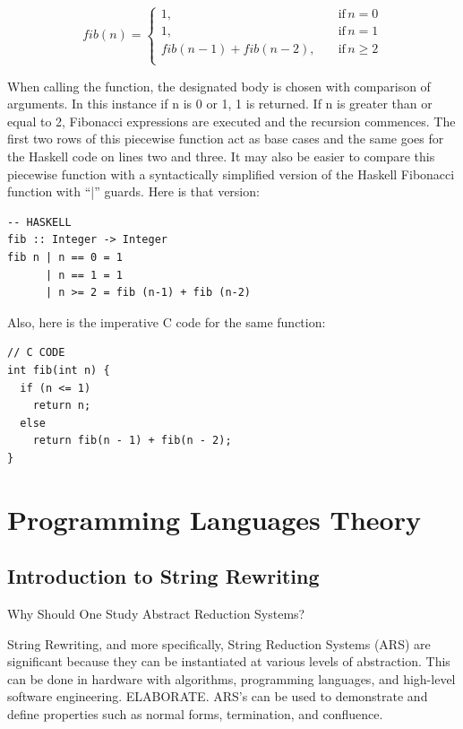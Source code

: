 \documentclass{article}
\begin{document}
\begin{equation*}
fib(n)=\begin{cases}
          1, \quad &\text{if} \, n = 0 \\
          1, \quad &\text{if} \, n = 1 \\
          fib(n-1)+fib(n-2), \quad &\text{if} \, n \geq 2 \\
      \end{cases}
\end{equation*}

\medskip\noindent
When calling the function, the designated body is chosen with comparison of arguments. In this instance if n is 0 or 1, 1 is returned. If n is greater than or equal to 2, Fibonacci expressions are executed and the recursion commences. The first two rows of this piecewise function act as base cases and the same goes for the Haskell code on lines two and three. It may also be easier to compare this piecewise function with a syntactically simplified version of the Haskell Fibonacci function with “|” guards. Here is that version:

\begin{lstlisting}[style=HaskellStyle]
-- HASKELL
fib :: Integer -> Integer
fib n | n == 0 = 1
      | n == 1 = 1
      | n >= 2 = fib (n-1) + fib (n-2)
\end{lstlisting}

\medskip\noindent
Also, here is the imperative C code for the same function:

\begin{lstlisting}[style=CStyle]
// C CODE
int fib(int n) {
  if (n <= 1)
    return n;
  else
    return fib(n - 1) + fib(n - 2);
}
\end{lstlisting}

\section{Programming Languages Theory}

\subsection{Introduction to String Rewriting}

\medskip\noindent
Why Should One Study Abstract Reduction Systems?

\medskip\noindent
String Rewriting, and more specifically, String Reduction Systems (ARS) are significant because they can be instantiated at various levels of abstraction. This can be done in hardware with algorithms, programming languages, and high-level software engineering. ELABORATE. ARS's can be used to demonstrate and define properties such as normal forms, termination, and confluence.
\end{document}
